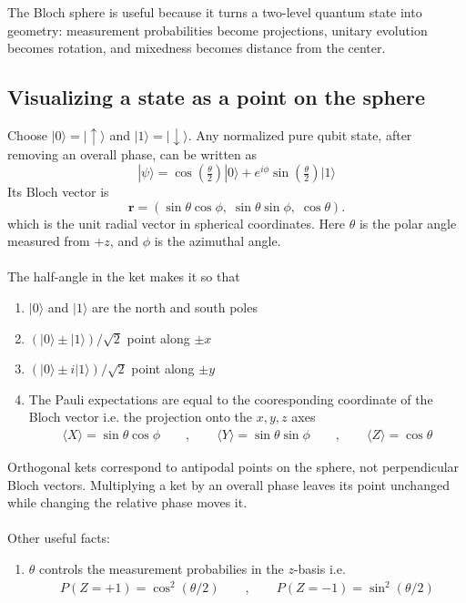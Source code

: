 \documentclass[11pt, answers]{exam}
\begin{document}
    The Bloch sphere is useful because it turns a two-level quantum state into geometry: measurement probabilities become projections, unitary evolution becomes rotation, and mixedness becomes distance from the center.
    \subsection{Visualizing a state as a point on the sphere}
    Choose \(|0\rangle=|\uparrow\rangle\) and \(|1\rangle=|\downarrow\rangle\). Any normalized pure qubit state, after removing an overall phase, can be written as
    \[
    |\psi\rangle=\cos\left(\tfrac{\theta}{2}\right)|0\rangle
    +e^{i\phi}\sin\left(\tfrac{\theta}{2}\right)|1\rangle
    \]Its Bloch vector is
    \[
    {\mathbf r=(\sin\theta\cos\phi,\;\sin\theta\sin\phi,\;\cos\theta).}
    \]
    which is the unit radial vector in spherical coordinates. Here \(\theta\) is the polar angle measured from \(+z\), and \(\phi\) is the azimuthal angle. \\ \\
    The half-angle in the ket makes it so that
    \begin{enumerate}[label=(\roman*)]
        \item \(|0\rangle\) and \(|1\rangle\) are the north and south poles
        \item \((|0\rangle\pm|1\rangle)/\sqrt2\) point along \(\pm x\)
        \item \((|0\rangle\pm i|1\rangle)/\sqrt2\) point along \(\pm y\)
        \item The Pauli expectations are equal to the cooresponding coordinate of the Bloch vector i.e. the projection onto the $x,y,z$ axes
        \begin{align*}
            \langle X\rangle=\sin\theta\cos\phi\qquad,\qquad\langle Y\rangle = \sin\theta\sin\phi\qquad,\qquad\langle Z\rangle=\cos\theta
        \end{align*}
    \end{enumerate}
    Orthogonal kets correspond to antipodal points on the sphere, not perpendicular Bloch vectors. Multiplying a ket by an overall phase leaves its point unchanged while changing the relative phase moves it. \\ \\
    Other useful facts:
    \begin{enumerate}[label=(\roman*)]
        \item $\theta$ controls the measurement probabilies in the $z$-basis i.e.
        \begin{align*}
            P(Z=+1)=\cos^2(\theta/2)\qquad,\qquad P(Z=-1)=\sin^2(\theta/2)
        \end{align*}
    \end{enumerate}
\end{document}
